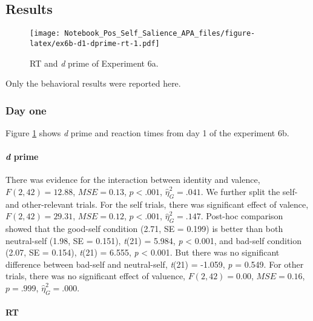 \documentclass[man]{apa6}
\let\oldparagraph\paragraph
\renewcommand{\paragraph}[1]{\oldparagraph{#1}\mbox{}}
\begin{document}
\hypertarget{results-10}{%
\subsection{Results}\label{results-10}}

\begin{figure}
\centering
\texttt{[image: Notebook\_Pos\_Self\_Salience\_APA\_files/figure-latex/ex6b-d1-dprime-rt-1.pdf]}
\caption{\label{fig:ex6b-d1-dprime-rt}RT and \emph{d} prime of Experiment 6a.}
\end{figure}

Only the behavioral results were reported here.

\hypertarget{day-one}{%
\subsubsection{Day one}\label{day-one}}

Figure \ref{fig:ex6b-d1-dprime-rt} shows \emph{d} prime and reaction times from day 1 of the experiment 6b.

\hypertarget{d-prime-7}{%
\paragraph{\texorpdfstring{\emph{d} prime}{d prime}}\label{d-prime-7}}

There was evidence for the interaction between identity and valence, \(F(2, 42) = 12.88\), \(\mathit{MSE} = 0.13\), \(p < .001\), \(\hat{\eta}^2_G = .041\). We further split the self- and other-relevant trials. For the self trials, there was significant effect of valence, \(F(2, 42) = 29.31\), \(\mathit{MSE} = 0.12\), \(p < .001\), \(\hat{\eta}^2_G = .147\). Post-hoc comparison showed that the good-self condition (2.71, SE = 0.199) is better than both neutral-self (1.98, SE = 0.151), \emph{t}(21) = 5.984, \emph{p} \textless{} 0.001, and bad-self condition (2.07, SE = 0.154), \emph{t}(21) = 6.555, \emph{p} \textless{} 0.001. But there was no significant difference between bad-self and neutral-self, \emph{t}(21) = -1.059, \emph{p} = 0.549. For other trials, there was no significant effect of valuence, \(F(2, 42) = 0.00\), \(\mathit{MSE} = 0.16\), \(p = .999\), \(\hat{\eta}^2_G = .000\).

\hypertarget{rt}{%
\paragraph{RT}\label{rt}}
\end{document}

